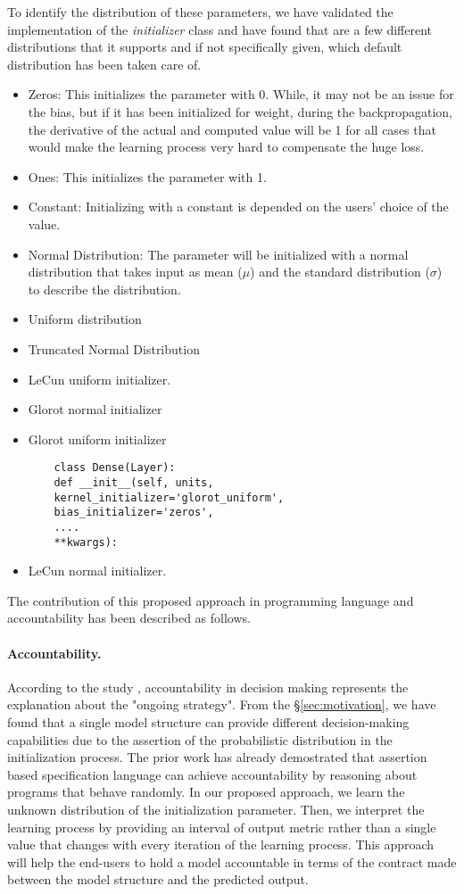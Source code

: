 To identify the distribution of these parameters, we have validated the implementation of the \emph{initializer} class and have found that are a few different distributions that it supports and if not specifically given, which default distribution has been taken care of.
\begin{itemize}
	\item Zeros: This initializes the parameter with 0. While, it may not be an issue for the bias, but if it has been initialized for weight, during the backpropagation, the derivative of the actual and computed value will be 1 for all cases that would make the learning process very hard to compensate the huge loss.
	\item Ones: This initializes the parameter with 1.
	\item Constant: Initializing with a constant is depended on the users' choice of the value.
	\item Normal Distribution: The parameter will be initialized with a normal distribution that takes input as mean ($\mu$) and the standard distribution ($\sigma$) to describe the distribution.
	\item Uniform distribution
	\item Truncated Normal Distribution
	\item LeCun uniform initializer.
	\item Glorot normal initializer
	\item Glorot uniform initializer
	\begin{lstlisting}
	class Dense(Layer):
	def __init__(self, units,
	kernel_initializer='glorot_uniform',
	bias_initializer='zeros',
	....
	**kwargs):\end{lstlisting}
	\item LeCun normal initializer.
\end{itemize}

The contribution of this proposed approach in programming language and accountability has been described as follows.
\paragraph{\textbf{Accountability.}} According to the study \cite{veale2018fairness}, accountability in decision making represents the explanation about the "ongoing strategy". From the \S\ref{sec:motivation}, we have found that a single model structure can provide different decision-making capabilities due to the assertion of the probabilistic distribution in the initialization process. The prior work \cite{sampson2014expressing} has already demostrated that assertion based specification language can achieve accountability by reasoning about programs that behave randomly. In our proposed approach, we learn the unknown distribution of the initialization parameter. Then, we interpret the learning process by providing an interval of output metric rather than a single value that changes with every iteration of the learning process. This approach will help the end-users to hold a model accountable in terms of the contract made between the model structure and the predicted output.
